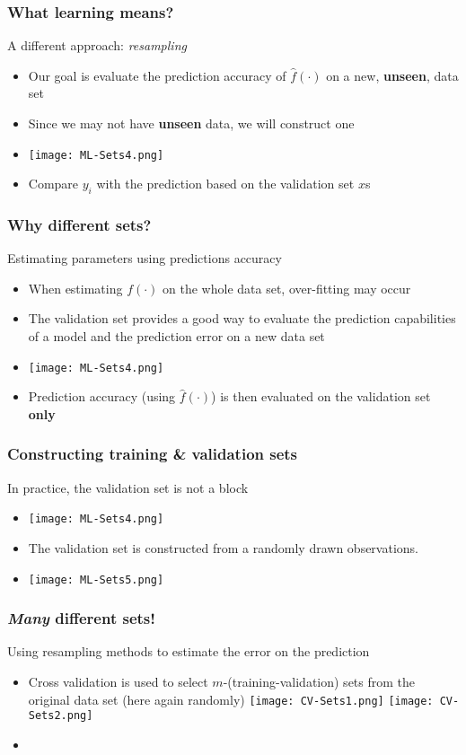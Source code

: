 \documentclass[xcolor=x11names,compress, aspectratio=169]{beamer}
\renewcommand{\(}{\begin{columns}}
\renewcommand{\)}{\end{columns}}
\newcommand{\<}[1]{\begin{column}{#1}}
\renewcommand{\>}{\end{column}}
\begin{document}
\begin{frame}
\frametitle{\textcolor{brique}{ What learning means?}}
A different approach: \textit{resampling}
\begin{itemize}[<+->]
\item Our goal is  evaluate the prediction accuracy of $\widehat f(\cdot)$ on a new, \textbf{unseen}, data set
\item Since we may not have \textbf{unseen} data, we will construct one
\item[] \texttt{[image: ML-Sets4.png]}
\item Compare $y_i$  with the prediction based on the validation set $x$s
\end{itemize}
\end{frame}



\begin{frame}
\frametitle{\textcolor{brique}{Why different sets? }}
Estimating parameters using predictions accuracy
\begin{itemize}[<+->]
\item When estimating $f(\cdot)$ on the whole data set, over-fitting may occur
\item The validation set provides a good way to evaluate the prediction capabilities of a model and the prediction error on a new data set
\item[] \texttt{[image: ML-Sets4.png]}
\item Prediction accuracy (using $\widehat f(\cdot)$) is then evaluated on the validation set \textbf{only}
\end{itemize}
\end{frame}


\begin{frame}
\frametitle{\textcolor{brique}{Constructing training \& validation sets}}
In practice, the validation set is not a block
\begin{itemize}[<+->]
\item[] \texttt{[image: ML-Sets4.png]}
\item The validation set is constructed from a randomly drawn observations.
\item[] \texttt{[image: ML-Sets5.png]}
\end{itemize}
\end{frame}


\begin{frame}
\frametitle{\textcolor{brique}{\textit{Many} different sets!  }}
Using resampling methods to  estimate the error on the prediction
\pause
\begin{itemize}[<+->]
\item Cross validation is used to select $m$-(training-validation) sets from the original data set (here again randomly)
 {\texttt{[image: CV-Sets1.png]}}
 {\texttt{[image: CV-Sets2.png]}}
 \item[]
\end{itemize}
\end{frame}
\end{document}
